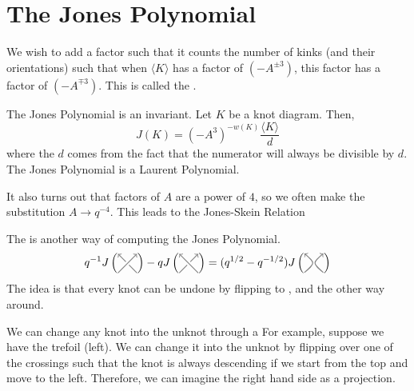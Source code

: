 \documentclass{article}
\begin{document}
\section{The Jones Polynomial}
We wish to add a factor such that it counts the number of kinks (and their orientations) such that when $\langle K\rangle$ has a factor of $(-A^{\pm 3})$, this factor has a factor of $(-A^{\mp 3})$. This is called the .
\begin{theorem}
    The Jones Polynomial is an invariant. Let $K$ be a knot diagram. Then,
    \begin{equation}
        J(K) = (-A^3)^{-w(K)} \frac{\langle K\rangle}{d}
    \end{equation}
    where the $d$ comes from the fact that the numerator will always be divisible by $d$. The Jones Polynomial is a Laurent Polynomial.
\end{theorem}
It also turns out that factors of $A$ are a power of $4$, so we often make the substitution $A \to q^{-4}$. This leads to the Jones-Skein Relation 
\begin{theorem}
    The  is another way of computing the Jones Polynomial. 
    \begin{equation}
        q^{-1}J\left(\upcross\right)-qJ\left(\downcross\right) = (q^{1/2}-q^{-1/2})J\left(\KPDArrow\right)
    \end{equation}
    The idea is that every knot can be undone by flipping  to , and the other way around.
\end{theorem}
We can change any knot into the unknot through a  For example, suppose we have the trefoil (left). We can change it into the unknot by flipping over one of the crossings such that the knot is always descending if we start from the top and move to the left. Therefore, we can imagine the right hand side as a projection.
\begin{center}
    \hspace{-10mm}
\end{center}\vspace{-6mm}
\end{document}
